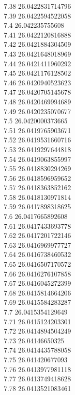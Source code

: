 {7.38	26.0422831714796\\
7.39	26.0422594522058\\
7.4	26.042235755608\\
7.41	26.0422120816888\\
7.42	26.0421884304509\\
7.43	26.0421648018969\\
7.44	26.0421411960292\\
7.45	26.0421176128502\\
7.46	26.0420940523623\\
7.47	26.0420705145678\\
7.48	26.0420469994689\\
7.49	26.0420235070677\\
7.5	26.0420000373665\\
7.51	26.0419765903671\\
7.52	26.0419531660716\\
7.53	26.0419297644818\\
7.54	26.0419063855997\\
7.55	26.0418830294269\\
7.56	26.0418596959652\\
7.57	26.0418363852162\\
7.58	26.0418130971814\\
7.59	26.0417898318625\\
7.6	26.0417665892608\\
7.61	26.0417433693778\\
7.62	26.0417201722146\\
7.63	26.0416969977727\\
7.64	26.0416738460532\\
7.65	26.0416507170572\\
7.66	26.0416276107858\\
7.67	26.0416045272399\\
7.68	26.0415814664206\\
7.69	26.0415584283287\\
7.7	26.0415354129649\\
7.71	26.0415124203301\\
7.72	26.0414894504249\\
7.73	26.04146650325\\
7.74	26.0414435788058\\
7.75	26.041420677093\\
7.76	26.0413977981118\\
7.77	26.0413749418628\\
7.78	26.0413521083461\\
}
